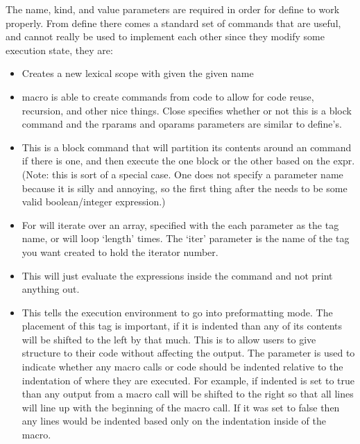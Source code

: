 The name, kind, and value parameters are required in order for define to
work properly.  From define there comes a standard set of commands that
are useful, and cannot really be used to implement each other since they
modify some \SCML{} execution state, they are:

\begin{itemize}
  \item {}
  Creates a new lexical scope with given the given name

  \item {}
  macro is able to create commands from \SCML{} code to allow for code
  reuse, recursion, and other nice things.  Close specifies whether
  or not this is a block command and the rparams and oparams
  parameters are similar to define's.

  \item {}
  This is a block command that will partition its contents
  around an  command if there is one, and then execute the
  one block or the other based on the expr.  (Note: this is sort of
  a special case.  One does not specify a parameter name because
  it is silly and annoying, so the first thing after the 
  needs to be some valid boolean/integer expression.)
  \item {}

  For will iterate over an array, specified with the each parameter as
  the tag name, or will loop `length' times.  The `iter' parameter
  is the name of the tag you want created to hold the iterator number.

  \item {}
  This will just evaluate the expressions inside
  the command and not print anything out.

  \item {}
  This tells the execution environment to go into preformatting
  mode. The placement of this tag is important, if it is indented than
  any of its contents will be shifted to the left by that much.  This is to
  allow users to give structure to their \SCML{} code without affecting the
  output.  The  parameter is used to indicate whether
  any macro calls or \SCML{} code should be indented relative to the
  indentation of where they are executed.  For example, if indented is set
  to true than any output from a macro call will be shifted to the right
  so that all lines will line up with the beginning of the macro call.  If
  it was set to false then any lines would be indented based only on the
  indentation inside of the macro.


\end{itemize}
